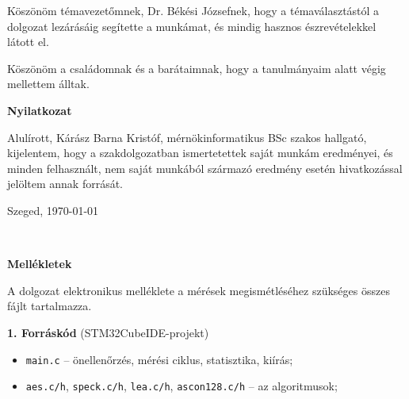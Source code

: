 \documentclass[a4paper,12pt]{report}
\theoremstyle{definition}
\theoremstyle{remark}
\begin{document}
\vspace{2 cm}

Köszönöm témavezetőmnek, Dr. Békési Józsefnek, hogy a témaválasztástól a dolgozat lezárásáig segítette a munkámat, és mindig hasznos észrevételekkel látott el.

Köszönöm a családomnak és a barátaimnak, hogy a tanulmányaim alatt végig mellettem álltak.

\newpage
{\Huge \bf Nyilatkozat}


\vspace{2 cm}

Alulírott, Kárász Barna Kristóf, mérnökinformatikus BSc szakos hallgató, kijelentem, hogy a szakdolgozatban ismertetettek saját munkám eredményei, és minden felhasznált, nem saját munkából származó eredmény esetén hivatkozással jelöltem annak forrását.


\begin{flushleft}
\vspace*{1cm}
Szeged, \today
\end{flushleft}

\begin{flushright}
 \vspace*{1cm}
 \makebox[7cm]{\rule{6cm}{.4pt}}\\
\end{flushright}

\pagebreak

\newpage
{\Huge \bf Mellékletek}


\vspace{2 cm}

A dolgozat elektronikus melléklete a mérések megismétléséhez szükséges összes fájlt tartalmazza. %

\medskip
\noindent\textbf{1. Forráskód} (STM32CubeIDE-projekt)
\begin{itemize}
	\item \texttt{main.c} -- önellenőrzés, mérési ciklus, statisztika, kiírás;
	\item \texttt{aes.c/h}, \texttt{speck.c/h}, \texttt{lea.c/h}, \texttt{ascon128.c/h} -- az algoritmusok;
\end{itemize}
\end{document}
